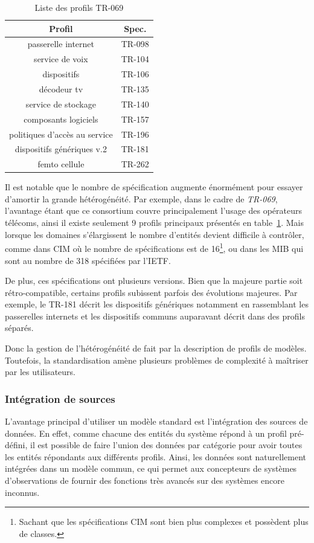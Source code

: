 \begin{table}
\centering
{\scriptsize
\begin{tabular}{cc}
\toprule
Profil & Spec. \\ \toprule
passerelle internet & TR-098 \\ \midrule
service de voix & TR-104 \\ \midrule
dispositifs & TR-106 \\ \midrule
décodeur tv & TR-135 \\ \midrule
service de stockage & TR-140 \\ \midrule
composants logiciels & TR-157 \\ \midrule
politiques d'accès au service &  TR-196 \\ \midrule
dispositifs génériques v.2 & TR-181 \\  \midrule
femto cellule & TR-262 \\ \bottomrule
\end{tabular}
}
\caption{Liste  des profils TR-069}\label{tab:rw:supervision:tr069dm}
\end{table}
Il est notable que le nombre de spécification augmente énormément pour essayer d'amortir la grande hétérogénéité. Par exemple, dans le cadre de \textit{TR-069}, l'avantage étant que ce consortium couvre principalement l'usage des opérateurs télécoms, ainsi il existe seulement 9 profils principaux présentés en table~\ref{tab:rw:supervision:tr069dm}. Mais lorsque les domaines s'élargissent le nombre d'entités devient difficile à contrôler, comme dans CIM où le nombre de spécifications est de 16\footnote{Sachant que les spécifications CIM sont bien plus complexes et possèdent plus de classes.}, ou dans les MIB qui sont au nombre de 318 spécifiées par l'IETF.

De plus, ces spécifications ont plusieurs versions. Bien que la majeure partie soit rétro-compatible, certains profils subissent parfois des évolutions majeures. Par exemple, le TR-181 décrit les dispositifs génériques notamment en rassemblant les passerelles internets et les dispositifs communs auparavant décrit dans des profils séparés. 

Donc la gestion de l'hétérogénéité de fait par la description de profils de modèles. Toutefois, la standardisation amène plusieurs problèmes de complexité à maîtriser par les utilisateurs.

\subsubsection{Intégration de sources}
L'avantage principal d'utiliser un modèle standard est l'intégration des sources de données. En effet, comme chacune des entités du système répond à un profil pré-défini, il est possible de faire l'union des données par catégorie pour avoir toutes les entités répondants aux différents profils. Ainsi, les données sont naturellement intégrées dans un modèle commun, ce qui permet aux concepteurs de systèmes d'observations de fournir des fonctions très avancés sur des systèmes encore inconnus.

